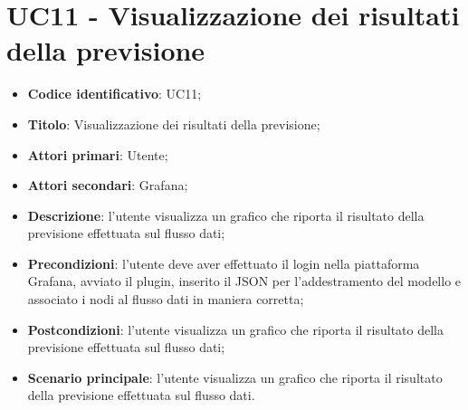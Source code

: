 \section{UC11 - Visualizzazione dei risultati della previsione}
\begin{itemize}
    \item \textbf{Codice identificativo}: UC11;
    \item \textbf{Titolo}: Visualizzazione dei risultati della previsione;
    \item \textbf{Attori primari}: Utente;
    \item \textbf{Attori secondari}: Grafana\glo;
    \item \textbf{Descrizione}: l'utente visualizza un grafico che riporta il risultato della previsione effettuata sul flusso dati;
    \item \textbf{Precondizioni}: l'utente deve aver effettuato il login nella piattaforma Grafana\glo, avviato il plugin, inserito il JSON per l'addestramento del modello e associato i nodi al flusso dati in maniera corretta;
    \item \textbf{Postcondizioni}: l'utente visualizza un grafico che riporta il risultato della previsione effettuata sul flusso dati;
    \item \textbf{Scenario principale}: l'utente visualizza un grafico che riporta il risultato della previsione effettuata sul flusso dati.
\end{itemize}